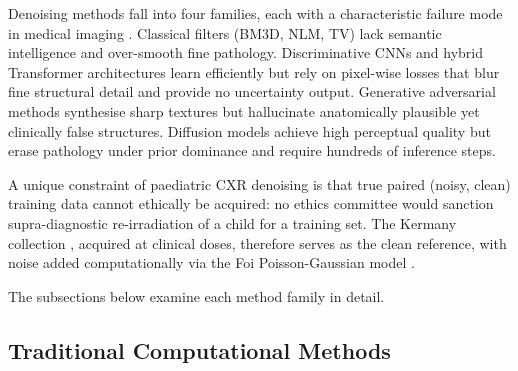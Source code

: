 \documentclass[12pt, a4paper, twoside, openright]{book}
\begin{document}
Denoising methods fall into four families, each with a characteristic failure mode in medical imaging \cite{willemink_preparing_2020}. Classical filters (BM3D, NLM, TV) lack semantic intelligence and over-smooth fine pathology. Discriminative CNNs and hybrid Transformer architectures \cite{zhang_beyond_2017, zhang_drunet_2021, liang_swinir_2021, zhang_hformer_2023} learn efficiently but rely on pixel-wise losses that blur fine structural detail and provide no uncertainty output. Generative adversarial methods \cite{goodfellow_generative_2014} synthesise sharp textures but hallucinate anatomically plausible yet clinically false structures. Diffusion models \cite{ho_denoising_2020} achieve high perceptual quality but erase pathology under prior dominance and require hundreds of inference steps.

A unique constraint of paediatric CXR denoising is that true paired (noisy, clean) training data cannot ethically be acquired: no ethics committee would sanction supra-diagnostic re-irradiation of a child for a training set. The Kermany collection \cite{kermany_identifying_2018}, acquired at clinical doses, therefore serves as the clean reference, with noise added computationally via the Foi Poisson-Gaussian model \cite{foi_practical_2008}.

The subsections below examine each method family in detail.

\subsection{Traditional Computational Methods}
\label{sec:intro:existing:classical}
\end{document}
